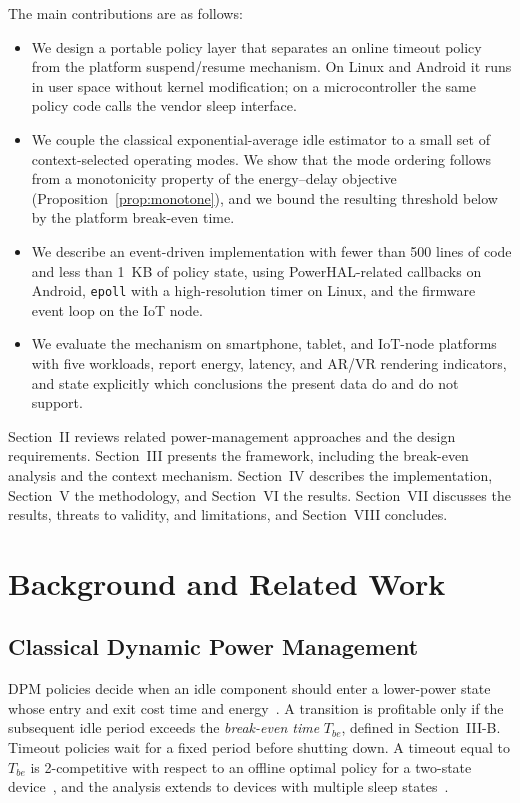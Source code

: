 \documentclass[journal]{IEEEtran}
\begin{document}
The main contributions are as follows:
\begin{itemize}
    \item We design a portable policy layer that separates an online timeout policy from the platform suspend/resume mechanism. On Linux and Android it runs in user space without kernel modification; on a microcontroller the same policy code calls the vendor sleep interface.
    \item We couple the classical exponential-average idle estimator to a small set of context-selected operating modes. We show that the mode ordering follows from a monotonicity property of the energy--delay objective (Proposition~\ref{prop:monotone}), and we bound the resulting threshold below by the platform break-even time.
    \item We describe an event-driven implementation with fewer than 500 lines of code and less than 1~KB of policy state, using PowerHAL-related callbacks on Android, \texttt{epoll} with a high-resolution timer on Linux, and the firmware event loop on the IoT node.
    \item We evaluate the mechanism on smartphone, tablet, and IoT-node platforms with five workloads, report energy, latency, and AR/VR rendering indicators, and state explicitly which conclusions the present data do and do not support.
\end{itemize}

Section~II reviews related power-management approaches and the design requirements. Section~III presents the framework, including the break-even analysis and the context mechanism. Section~IV describes the implementation, Section~V the methodology, and Section~VI the results. Section~VII discusses the results, threats to validity, and limitations, and Section~VIII concludes.

\section{Background and Related Work}
\subsection{Classical Dynamic Power Management}
DPM policies decide when an idle component should enter a lower-power state whose entry and exit cost time and energy~\cite{benini2000survey}. A transition is profitable only if the subsequent idle period exceeds the \emph{break-even time} $T_{be}$, defined in Section~III-B. Timeout policies wait for a fixed period before shutting down. A timeout equal to $T_{be}$ is 2-competitive with respect to an offline optimal policy for a two-state device~\cite{karlin1994competitive}, and the analysis extends to devices with multiple sleep states~\cite{irani2003online}.
\end{document}
